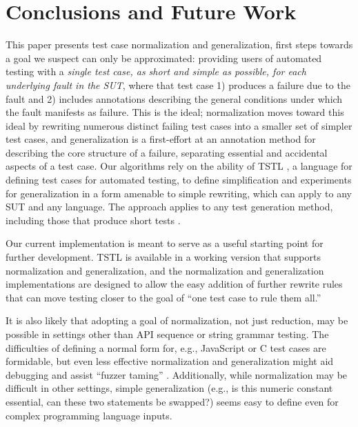 \section{Conclusions and Future Work}

This paper presents test case normalization and generalization, first
steps towards a goal we suspect can only be approximated: providing
users of automated testing with a \emph{single test case, as short and
  simple as possible, for each underlying fault in the SUT}, where
that test case 1) produces a failure due to the fault and 2) includes
annotations describing the general conditions under which the fault
manifests as failure.  This is the ideal; normalization moves toward
this ideal by rewriting numerous distinct failing test cases into a
smaller set of simpler test cases, and generalization is a
first-effort at an annotation method for describing the core structure
of a failure, separating essential and accidental aspects of a test
case.  Our algorithms rely on the ability of TSTL \cite{NFM15,ISSTA15}, a language for
defining test cases for automated testing, to define simplification
and experiments for generalization in a form amenable to simple
rewriting, which can apply to any SUT and any language.  The approach applies to any test generation
method, including those that produce short tests \cite{FA11,SoftBET}.

Our current implementation is meant to serve as a useful starting
point for further development.  TSTL is available in a working version
\cite{tstl} that supports normalization and generalization, and the
normalization and generalization implementations are designed to allow
the easy addition of further rewrite rules that can move testing closer to
the goal of ``one test case to rule them all.''

It is also likely that adopting a goal of normalization, not just
reduction, may be possible in settings other than API sequence or
string grammar testing.  The difficulties of defining a normal form
for, e.g., JavaScript \cite{jsfunfuzz} or C \cite{CReduce} test cases
are formidable, but even less effective normalization and
generalization might aid debugging and assist ``fuzzer taming''
\cite{PLDI13}.  Additionally, while normalization may be difficult in
other settings, simple generalization (e.g., is this numeric constant
essential, can these two statements be swapped?) seems easy to define
even for complex programming language inputs.
